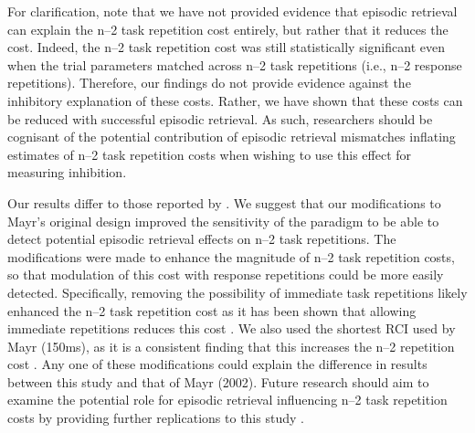 \documentclass[a4paper, man, natbib]{apa6}
\begin{document}
For clarification, note that we have not provided evidence that episodic retrieval can explain the n--2 task repetition cost entirely, but rather that it reduces the cost. Indeed, the n--2 task repetition cost was still statistically significant even when the trial parameters matched across n--2 task repetitions (i.e., n--2 response repetitions). Therefore, our findings do not provide evidence against the inhibitory explanation of these costs. Rather, we have shown that these costs can be reduced with successful episodic retrieval. As such, researchers should be cognisant of the potential contribution of episodic retrieval mismatches inflating estimates of n--2 task repetition costs when wishing to use this effect for measuring inhibition.

Our results differ to those reported by \cite{Mayr2002}. We suggest that our modifications to Mayr's original design improved the sensitivity of the paradigm to be able to detect potential episodic retrieval effects on n--2 task repetitions. The modifications were made to enhance the magnitude of n--2 task repetition costs, so that modulation of this cost with response repetitions could be more easily detected. Specifically, removing the possibility of immediate task repetitions likely enhanced the n--2 task repetition cost as it has been shown that allowing immediate repetitions reduces this cost \citep{Philipp2006}. We also used the shortest RCI used by Mayr (150ms), as it is a consistent finding that this increases the n--2 repetition cost \cite{Gade2005, Grange2009, Mayr2000, Mayr2002}. Any one of these modifications could explain the difference in results between this study and that of Mayr (2002). Future research should aim to examine the potential role for episodic retrieval influencing n--2 task repetition costs by providing further replications to this study \citep{OpenScienceCollaboration2015}.






\end{document}
